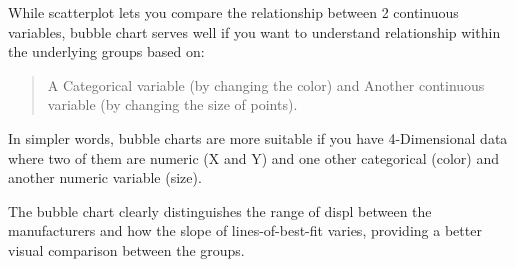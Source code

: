 \documentclass[a4paper]{article}
\newenvironment{Shaded}{}{}
\newcommand{\KeywordTok}[1]{\textcolor[rgb]{0.00,0.00,1.00}{#1}}
\newcommand{\DataTypeTok}[1]{#1}
\newcommand{\StringTok}[1]{\textcolor[rgb]{0.00,0.50,0.50}{#1}}
\newcommand{\CommentTok}[1]{\textcolor[rgb]{0.00,0.50,0.00}{#1}}
\newcommand{\OperatorTok}[1]{#1}
\newcommand{\NormalTok}[1]{#1}
\begin{document}
While scatterplot lets you compare the relationship between 2 continuous
variables, bubble chart serves well if you want to understand
relationship within the underlying groups based on:

\begin{quote}
A Categorical variable (by changing the color) and Another continuous
variable (by changing the size of points).
\end{quote}

In simpler words, bubble charts are more suitable if you have
4-Dimensional data where two of them are numeric (X and Y) and one other
categorical (color) and another numeric variable (size).

The bubble chart clearly distinguishes the range of displ between the
manufacturers and how the slope of lines-of-best-fit varies, providing a
better visual comparison between the groups.

\begin{Shaded}
\end{Shaded}
\end{document}
